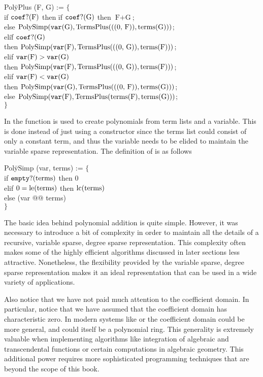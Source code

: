 \begindsacode
Pol\=yPlus (F, G) := $\{$ \\
\>if $\mathop{\tt coef?}\nolimits(\mbox{F})$ then \=if $\mathop{\tt coef?}\nolimits(\mbox{G})$ then $\mbox{F}+\mbox{G}$; \\
\>\>else $\mbox{PolySimp}(\mathop{\tt var}\nolimits(\mbox{G}), \mbox{TermsPlus}(\mbox{((0, F))}, \operatorname{terms}(\mbox{G})))$; \\
\>eli\=f $\mathop{\tt coef?}\nolimits(\mbox{G})$\\
\>\> then $\mbox{PolySimp}(\mathop{\tt var}\nolimits(\mbox{F}), \mbox{TermsPlus}(\mbox{((0, G))}, \operatorname{terms}(\mbox{F})))$; \\
\>elif $\mathop{\tt var}\nolimits(\mbox{F}) > \mathop{\tt var}\nolimits(\mbox{G})$ \\
\>\>then $\mbox{PolySimp}(\mathop{\tt var}\nolimits(\mbox{F}), \mbox{TermsPlus}(\mbox{((0, G))}, \operatorname{terms}(\mbox{F})))$; \\
\>elif $\mathop{\tt var}\nolimits(\mbox{F}) < \mathop{\tt var}\nolimits(\mbox{G})$ \\
\>\>then $\mbox{PolySimp}(\mathop{\tt var}\nolimits(\mbox{G}), \mbox{TermsPlus}(\mbox{((0, \mbox{F}))}, \operatorname{terms}(\mbox{G})))$; \\
\>else $\mbox{PolySimp}(\mathop{\tt var}\nolimits(\mbox{F}), \mbox{TermsPlus}(\operatorname{terms}(\mbox{F}), \operatorname{terms}(\mbox{G})))$;\\
\>$\}$
\enddsacode

In  the function  is used to create
polynomials from term lists and a variable.  This is done instead of
just using a constructor since the terms list could consist of only a
constant term, and thus the variable needs to be elided to maintain
the variable sparse representation.  The definition of 
is as follows

\begindsacode
Pol\=ySimp (var, terms) := $\{$\\
\>if $\mathop{\tt empty?}\nolimits(\mbox{terms})$ then $0$ \\
\>elif $0 = \operatorname{le}(\mbox{terms})$ then $\operatorname{lc}(\mbox{terms})$\\
\>else (var @@ terms)\\
\> $\}$
\enddsacode

The basic idea behind polynomial addition is quite simple.  However,
it was necessary to introduce a bit of complexity in order to maintain
all the details of a recursive, variable sparse, degree sparse
representation.  This complexity often makes some of the highly
efficient algorithms discussed in later sections less attractive.
Nonetheless, the flexibility provided by the variable sparse, degree
sparse representation makes it an ideal representation that can be
used in a wide variety of applications.

Also notice that we have not paid much attention to the coefficient
domain.  In particular, notice that we have assumed that the
coefficient domain has characteristic zero.  In modern systems like
{\Axiom} \cite{Jenks1992-cu} or {\Weyl} \cite{Zippel1993-ef} the coefficient
domain could be more general, and could itself be a polynomial ring.
This generality is extremely valuable when implementing algorithms
like integration of algebraic and transcendental functions or certain
computations in algebraic geometry.  This additional power requires
more sophisticated programming techniques that are beyond the scope of
this book.

